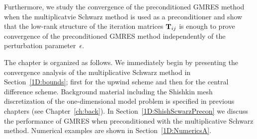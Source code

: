 Furthermore, we study the convergence of the preconditioned GMRES method when
the multiplicatvie Schwarz method is used as a preconditioner and show that the
low-rank structure of the iteration matrices $\mathbf{T}_{ij}$ is enough to prove
convergence of the preconditioned GMRES method independently of the
perturbation parameter~$\epsilon$.

The chapter is organized as follows. We immediately begin by presenting
the convergence analysis of the multiplicative Schwarz method in
Section~\ref{1D:bounds}; first for the upwind scheme and
then for the central difference scheme. Background material including the
Shishkin mesh discretization of the one-dimensional model problem is specified
in previous chapters (see Chapter~\ref{ch:back}). In Section~\ref{1D:ShishScwarzPrecon} we discuss the performance of GMRES when
preconditioned with the multiplicative Schwarz method.
Numerical examples are shown in Section~\ref{1D:NumericsA}.


